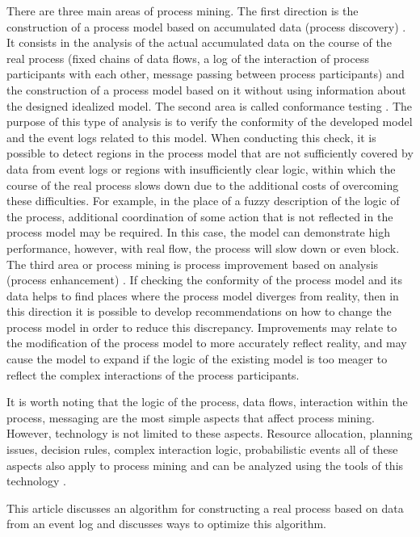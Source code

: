 \documentclass[
11pt,%
tightenlines,%
twoside,%
onecolumn,%
nofloats,%
nobibnotes,%
nofootinbib,%
superscriptaddress,%
noshowpacs,%
centertags]%
{revtex4}
\begin{document}
There are three main areas of process mining.
The first direction is the construction of a process model based on accumulated data (process discovery) \cite{BPM2_Discovery}.
It consists in the analysis of the actual accumulated data on the course of the real process (fixed chains of data flows, a log of the interaction of process participants with each other, message passing between process participants) and the construction of a process model based on it without using information about the designed idealized model.
The second area is called conformance testing \cite{Conformance}.
The purpose of this type of analysis is to verify the conformity of the developed model and the event logs related to this model.
When conducting this check, it is possible to detect regions in the process model that are not sufficiently covered by data from event logs or regions with insufficiently clear logic, within which the course of the real process slows down due to the additional costs of overcoming these difficulties.
For example, in the place of a fuzzy description of the logic of the process, additional coordination of some action that is not reflected in the process model may be required.
In this case, the model can demonstrate high performance, however, with real flow, the process will slow down or even block.
The third area or process mining is process improvement based on analysis (process enhancement) \cite{Enhancement}.
If checking the conformity of the process model and its data helps to find places where the process model diverges from reality, then in this direction it is possible to develop recommendations on how to change the process model in order to reduce this discrepancy.
Improvements may relate to the modification of the process model to more accurately reflect reality, and may cause the model to expand if the logic of the existing model is too meager to reflect the complex interactions of the process participants.

It is worth noting that the logic of the process, data flows, interaction within the process, messaging are the most simple aspects that affect process mining.
However, technology is not limited to these aspects.
Resource allocation, planning issues, decision rules, complex interaction logic, probabilistic events all of these aspects also apply to process mining and can be analyzed using the tools of this technology \cite{Metrics}.

This article discusses an algorithm for constructing a real process based on data from an event log and discusses ways to optimize this algorithm.
\end{document}
